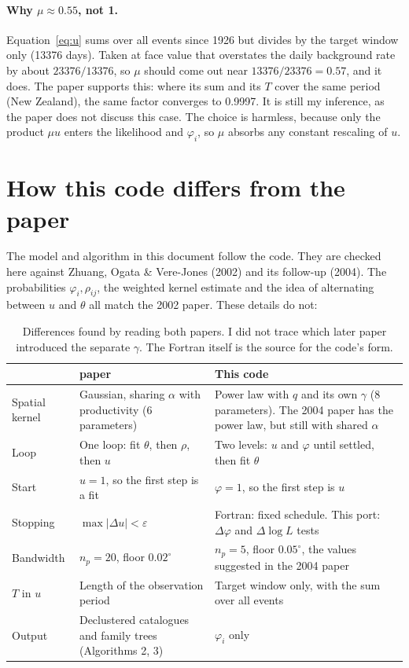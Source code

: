 \documentclass[11pt,a4paper]{article}
\begin{document}
\medskip
\paragraph{Why $\mu\approx0.55$, not 1.}
Equation~\eqref{eq:u} sums over all events since 1926 but divides by the target window only (13376
days). Taken at face value that overstates the daily background rate by about $23376/13376$, so
$\mu$ should come out near $13376/23376=0.57$, and it does. The paper supports this: where its sum
and its $T$ cover the same period (New Zealand), the same factor converges to 0.9997. It is still
my inference, as the paper does not discuss this case. The choice is harmless, because only the
product $\mu u$ enters the likelihood and $\varphi_i$, so $\mu$ absorbs any constant rescaling of $u$.

\section{How this code differs from the paper}
\label{sec:paper}

The model and algorithm in this document follow the code. They are checked here against Zhuang,
Ogata \& Vere-Jones (2002) and its follow-up (2004). The probabilities $\varphi_i,\rho_{ij}$, the
weighted kernel estimate and the idea of alternating between $u$ and $\theta$ all match the 2002 paper.
These details do not:

\begin{table}[H]
\centering\small
\begin{tabular}{@{}l>{\raggedright\arraybackslash}p{5.3cm}>{\raggedright\arraybackslash}p{5.9cm}@{}}
\toprule
 & 2002 paper & This code \\
\midrule
Spatial kernel & Gaussian, sharing $\alpha$ with productivity (6 parameters) &
  Power law with $q$ and its own $\gamma$ (8 parameters). The 2004 paper has the power law, but still with shared $\alpha$ \\
Loop & One loop: fit $\theta$, then $\rho$, then $u$ & Two levels: $u$ and $\varphi$ until settled, then fit $\theta$ \\
Start & $u=1$, so the first step is a fit & $\varphi=1$, so the first step is $u$ \\
Stopping & $\max|\Delta u|<\varepsilon$ & Fortran: fixed schedule. This port: $\Delta\varphi$ and $\Delta\log L$ tests \\
Bandwidth & $n_p=20$, floor $0.02^\circ$ & $n_p=5$, floor $0.05^\circ$, the values suggested in the 2004 paper \\
$T$ in $u$ & Length of the observation period & Target window only, with the sum over all events \\
Output & Declustered catalogues and family trees (Algorithms 2, 3) & $\varphi_i$ only \\
\bottomrule
\end{tabular}
\caption{Differences found by reading both papers. I did not trace which later paper introduced
the separate $\gamma$. The Fortran itself is the source for the code's form.}
\end{table}
\end{document}
